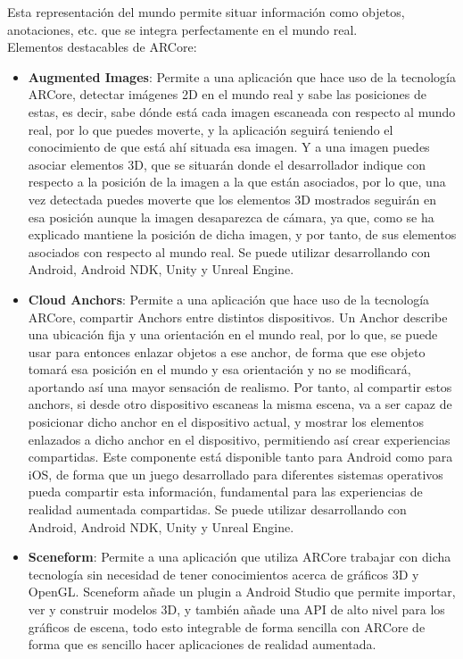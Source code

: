 Esta representación del mundo permite situar información como objetos, anotaciones, etc. que se integra perfectamente en el mundo real.\cite{arcore}\\

Elementos destacables de ARCore:

\begin{itemize}
  \item \textbf{Augmented Images}: Permite a una aplicación que hace uso de la tecnología ARCore, detectar imágenes 2D en el mundo real y sabe las posiciones de estas, es decir, sabe dónde está cada imagen escaneada con respecto al mundo real, por lo que puedes moverte, y la aplicación seguirá teniendo el conocimiento de que está ahí situada esa imagen. Y a una imagen puedes asociar elementos 3D, que se situarán donde el desarrollador indique con respecto a la posición de la imagen a la que están asociados, por lo que, una vez detectada puedes moverte que los elementos 3D mostrados seguirán en esa posición aunque la imagen desaparezca de cámara, ya que, como se ha explicado mantiene la posición de dicha imagen, y por tanto, de sus elementos asociados con respecto al mundo real. Se puede utilizar desarrollando con Android, Android NDK, Unity y Unreal Engine. \cite{arcore-augmented-images}

  \item \textbf{Cloud Anchors}: Permite a una aplicación que hace uso de la tecnología ARCore, compartir Anchors entre distintos dispositivos. Un Anchor describe una ubicación fija y una orientación en el mundo real, por lo que, se puede usar para entonces enlazar objetos a ese anchor, de forma que ese objeto tomará esa posición en el mundo y esa orientación y no se modificará, aportando así una mayor sensación de realismo\cite{arcore-anchors}. Por tanto, al compartir estos anchors, si desde otro dispositivo escaneas la misma escena, va a ser capaz de posicionar dicho anchor en el dispositivo actual, y mostrar los elementos enlazados a dicho anchor en el dispositivo, permitiendo así crear experiencias compartidas. Este componente está disponible tanto para Android como para iOS, de forma que un juego desarrollado para diferentes sistemas operativos pueda compartir esta información, fundamental para las experiencias de realidad aumentada compartidas. Se puede utilizar desarrollando con Android, Android NDK, Unity y Unreal Engine. \cite{arcore-cloud-anchors}

  \item \textbf{Sceneform}: Permite a una aplicación que utiliza ARCore trabajar con dicha tecnología sin necesidad de tener conocimientos acerca de gráficos 3D y OpenGL. Sceneform añade un plugin a Android Studio que permite importar, ver y construir modelos 3D, y también añade una API de alto nivel para los gráficos de escena, todo esto integrable de forma sencilla con ARCore de forma que es sencillo hacer aplicaciones de realidad aumentada. \cite{arcore-sceneform}

\end{itemize}

